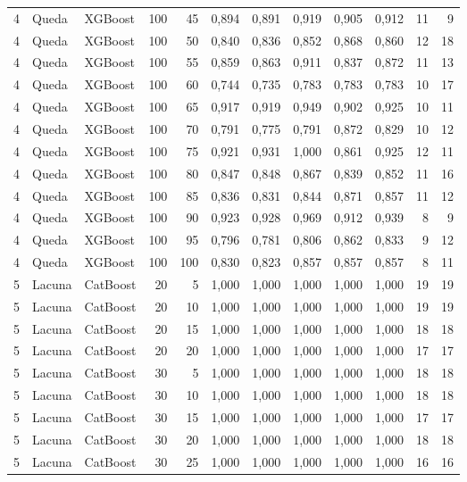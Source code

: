\begin{longtable}{@{}rllrrrrrrrrr@{}}
4 & Queda & XGBoost & 100 & 45 & 0,894 & 0,891 & 0,919 & 0,905 & 0,912 & 11 & 9 \\
4 & Queda & XGBoost & 100 & 50 & 0,840 & 0,836 & 0,852 & 0,868 & 0,860 & 12 & 18 \\
4 & Queda & XGBoost & 100 & 55 & 0,859 & 0,863 & 0,911 & 0,837 & 0,872 & 11 & 13 \\
4 & Queda & XGBoost & 100 & 60 & 0,744 & 0,735 & 0,783 & 0,783 & 0,783 & 10 & 17 \\
4 & Queda & XGBoost & 100 & 65 & 0,917 & 0,919 & 0,949 & 0,902 & 0,925 & 10 & 11 \\
4 & Queda & XGBoost & 100 & 70 & 0,791 & 0,775 & 0,791 & 0,872 & 0,829 & 10 & 12 \\
4 & Queda & XGBoost & 100 & 75 & 0,921 & 0,931 & 1,000 & 0,861 & 0,925 & 12 & 11 \\
4 & Queda & XGBoost & 100 & 80 & 0,847 & 0,848 & 0,867 & 0,839 & 0,852 & 11 & 16 \\
4 & Queda & XGBoost & 100 & 85 & 0,836 & 0,831 & 0,844 & 0,871 & 0,857 & 11 & 12 \\
4 & Queda & XGBoost & 100 & 90 & 0,923 & 0,928 & 0,969 & 0,912 & 0,939 & 8 & 9 \\
4 & Queda & XGBoost & 100 & 95 & 0,796 & 0,781 & 0,806 & 0,862 & 0,833 & 9 & 12 \\
4 & Queda & XGBoost & 100 & 100 & 0,830 & 0,823 & 0,857 & 0,857 & 0,857 & 8 & 11 \\
5 & Lacuna & CatBoost & 20 & 5 & 1,000 & 1,000 & 1,000 & 1,000 & 1,000 & 19 & 19 \\
5 & Lacuna & CatBoost & 20 & 10 & 1,000 & 1,000 & 1,000 & 1,000 & 1,000 & 19 & 19 \\
5 & Lacuna & CatBoost & 20 & 15 & 1,000 & 1,000 & 1,000 & 1,000 & 1,000 & 18 & 18 \\
5 & Lacuna & CatBoost & 20 & 20 & 1,000 & 1,000 & 1,000 & 1,000 & 1,000 & 17 & 17 \\
5 & Lacuna & CatBoost & 30 & 5 & 1,000 & 1,000 & 1,000 & 1,000 & 1,000 & 18 & 18 \\
5 & Lacuna & CatBoost & 30 & 10 & 1,000 & 1,000 & 1,000 & 1,000 & 1,000 & 18 & 18 \\
5 & Lacuna & CatBoost & 30 & 15 & 1,000 & 1,000 & 1,000 & 1,000 & 1,000 & 17 & 17 \\
5 & Lacuna & CatBoost & 30 & 20 & 1,000 & 1,000 & 1,000 & 1,000 & 1,000 & 18 & 18 \\
5 & Lacuna & CatBoost & 30 & 25 & 1,000 & 1,000 & 1,000 & 1,000 & 1,000 & 16 & 16 \\

\end{longtable}
